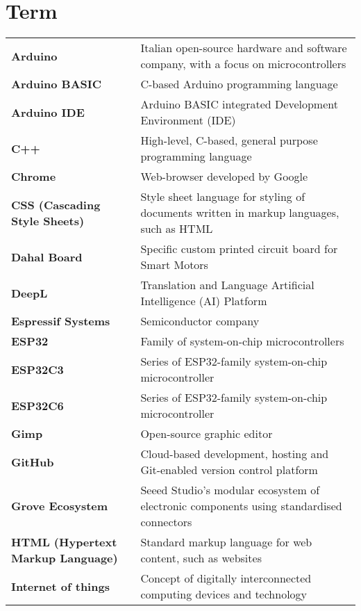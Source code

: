 \section*{\hspace{0pt}Term \hspace{111pt}{Definition}}%
{\renewcommand{\arraystretch}{1.5} \renewcommand{\tabcolsep}{0.cm}
\begin{longtable}{>{\raggedright \bfseries}p{} p{}}
Arduino             & Italian open-source hardware and software company, with a focus on microcontrollers \\
Arduino BASIC       & C-based Arduino programming language \\
Arduino IDE         & Arduino BASIC integrated Development Environment (IDE) \\
C++                 & High-level, C-based, general purpose programming language \\
Chrome              & Web-browser developed by Google \\
CSS (Cascading Style Sheets)    & Style sheet language for styling of documents written in markup languages, such as HTML \\
Dahal Board         & Specific custom printed circuit board for Smart Motors \\
DeepL               & Translation and Language Artificial Intelligence (AI) Platform \\
Espressif Systems   & Semiconductor company \\
ESP32               & Family of system-on-chip microcontrollers \\
ESP32C3             & Series of ESP32-family system-on-chip microcontroller \\
ESP32C6             & Series of ESP32-family system-on-chip microcontroller \\
Gimp                & Open-source graphic editor \\
GitHub              & Cloud-based development, hosting and Git-enabled version control platform \\
Grove Ecosystem     & Seeed Studio's modular ecosystem of electronic components using standardised connectors \\
HTML (Hypertext \quad \quad \quad Markup Language)& Standard markup language for web content, such as websites \\
Internet of things  & Concept of digitally interconnected computing devices and technology \\

\end{longtable}}
